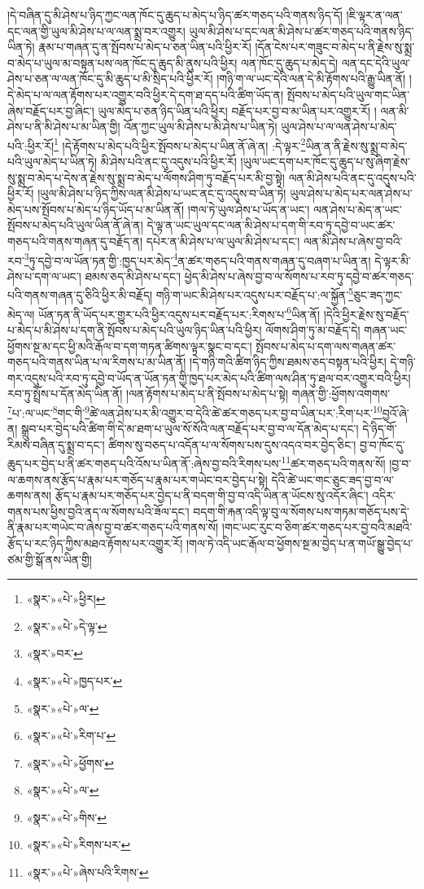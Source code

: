 །དེ་བཞིན་དུ་མི་ཤེས་པ་ཉིད་ཀྱང་ལན་ཁོང་དུ་ཆུད་པ་མེད་པ་ཉིད་ཚར་གཅད་པའི་གནས་ཉིད་དོ། །ཇི་ལྟར་ན་ལན་དང་ལན་གྱི་ཡུལ་མི་ཤེས་པ་ལ་ལན་སྨྲ་བར་འགྱུར། ཡུལ་མི་ཤེས་པ་དང་ལན་མི་ཤེས་པ་ཚར་གཅད་པའི་གནས་ཉིད་ཡིན་ཏེ། རྣམ་པ་གཞན་དུ་ན་སྤོབས་པ་མེད་པ་ཅན་ཡིན་པའི་ཕྱིར་རོ། །དོན་ངེས་པར་གཟུང་བ་མེད་པ་ནི་རྗེས་སུ་སྨྲ་བ་མེད་པ་ཡུལ་མ་བསྟན་པས་ལན་ཁོང་དུ་ཆུད་མི་ནུས་པའི་ཕྱིར། ལན་ཁོང་དུ་ཆུད་པ་མེད་དེ། ལན་དང་དེའི་ཡུལ་ཤེས་པ་ཅན་ལ་ལན་ཁོང་དུ་མི་ཆུད་པ་མི་སྲིད་པའི་ཕྱིར་རོ། །གཉི་ག་ལ་ཡང་དེའི་ལན་དེ་མི་རྟོགས་པའི་རྒྱུ་ཡིན་ནོ། །དེ་མེད་པ་ལ་ལན་རྟོགས་པར་འགྱུར་བའི་ཕྱིར་དེ་དག་ཐ་དད་པའི་ཚིག་ཡོད་ན། སྤོབས་པ་མེད་པའི་ཡུལ་གང་ཡིན་ཞེས་བརྗོད་པར་བྱ་ཞིང་། ཡུལ་མེད་པ་ཅན་ཉིད་ཡིན་པའི་ཕྱིར། བརྗོད་པར་བྱ་བ་མ་ཡིན་པར་འགྱུར་རོ། །
ལན་མི་ཤེས་པ་ནི་མི་ཤེས་པ་མ་ཡིན་གྱི། འོན་ཀྱང་ཡུལ་མི་ཤེས་པ་མི་ཤེས་པ་ཡིན་ཏེ། ཡུལ་ཤེས་པ་ལ་ལན་ཤེས་པ་མེད་པའི་:ཕྱིར་རོ།\footnote{«སྣར་»«པེ་»ཕྱིར།} །དེ་རྟོགས་པ་མེད་པའི་ཕྱིར་སྤོབས་པ་མེད་པ་ཡིན་ནོ་ཞེ་ན། :དེ་ལྟར་\footnote{«སྣར་»«པེ་»དེ་ལྟ་}ཡིན་ན་ནི་རྗེས་སུ་སྨྲ་བ་མེད་པའི་ཡུལ་མེད་པ་ཡིན་ཏེ། མི་ཤེས་པའི་ནང་དུ་འདུས་པའི་ཕྱིར་རོ། །ཡུལ་ཡང་དག་པར་ཁོང་དུ་ཆུད་པ་སུ་ཞིག་རྗེས་སུ་སྨྲ་བ་མེད་པ་དེས་ན་རྗེས་སུ་སྨྲ་བ་མེད་པ་ལོགས་ཤིག་ཏུ་བརྗོད་པར་མི་བྱ་སྟེ། ལན་མི་ཤེས་པའི་ནང་དུ་འདུས་པའི་ཕྱིར་རོ། །ཡུལ་མི་ཤེས་པ་ཉིད་ཀྱིས་ལན་མི་ཤེས་པ་ཡང་ནང་དུ་འདུས་བ་ཡིན་ཏེ། ཡུལ་ཤེས་པ་མེད་པར་ལན་ཤེས་པ་མེད་པས་སྤོབས་པ་མེད་པ་ཉིད་ཡོད་པ་མ་ཡིན་ནོ། །གལ་ཏེ་ཡུལ་ཤེས་པ་ཡོད་ན་ཡང་། ལན་ཤེས་པ་མེད་ན་ཡང་སྤོབས་པ་མེད་པའི་ཡུལ་ཡིན་ནོ་ཞེ་ན། དེ་ལྟ་ན་ཡང་ཡུལ་དང་ལན་མི་ཤེས་པ་དག་གི་རབ་ཏུ་དབྱེ་བ་ཡང་ཚར་གཅད་པའི་གནས་གཞན་དུ་བརྗོད་ན། དཔེར་ན་མི་ཤེས་པ་ལ་ཡུལ་མི་ཤེས་པ་དང་། ལན་མི་ཤེས་པ་ཞེས་བྱ་བའི་རབ་\footnote{«སྣར་»བར་}ཏུ་དབྱེ་བ་ལ་ཡོན་ཏན་གྱི་:ཁྱད་པར་མེད་\footnote{«སྣར་»«པེ་»ཁྱད་པར་}ན་ཚར་གཅད་པའི་གནས་གཞན་དུ་བཞག་པ་ཡིན་ན། དེ་ལྟར་མི་ཤེས་པ་དག་ལ་ཡང་། ཐམས་ཅད་མི་ཤེས་པ་དང་། ཕྱེད་མི་ཤེས་པ་ཞེས་བྱ་བ་ལ་སོགས་པ་རབ་ཏུ་དབྱེ་བ་ཚར་གཅད་པའི་གནས་གཞན་དུ་ཅིའི་ཕྱིར་མི་བརྗོད། གཉི་ག་ཡང་མི་ཤེས་པར་འདུས་པར་བརྗོད་པ་:ལ་སྐྱོན་\footnote{«སྣར་»«པེ་»ལ་}ཅུང་ཟད་ཀྱང་མེད་ལ། ཡོན་ཏན་ནི་ཡོད་པར་གྱུར་པའི་ཕྱིར་འདུས་པར་བརྗོད་པར་:རིགས་པ་\footnote{«སྣར་»«པེ་»རིག་པ་}ཡིན་ནོ། །དེའི་ཕྱིར་རྗེས་སུ་བརྗོད་པ་མེད་པ་མི་ཤེས་པ་དག་ནི་སྤོབས་པ་མེད་པའི་ཡུལ་ཉིད་ཡིན་པའི་ཕྱིར། ལོགས་ཤིག་ཏུ་མ་བརྗོད་དེ། གཞན་ཡང་ཕྱོགས་སྔ་མ་དང་ཕྱི་མའི་རྒོལ་བ་དག་གཏན་ཚིགས་ལྟར་སྣང་བ་དང་། སྤོབས་པ་མེད་པ་དག་ལས་གཞན་ཚར་གཅད་པའི་གནས་ཡིན་པ་ལ་རིགས་པ་མ་ཡིན་ནོ། །དེ་གཉི་གའི་ཚིག་ཉིད་ཀྱིས་ཐམས་ཅད་བསྟན་པའི་ཕྱིར། དེ་གཉི་གར་འདུས་པའི་རབ་ཏུ་དབྱེ་བ་ཡོད་ན་ཡོན་ཏན་གྱི་ཁྱད་པར་མེད་པའི་ཚིག་ལས་ཤིན་ཏུ་ཐལ་བར་འགྱུར་བའི་ཕྱིར། རབ་ཏུ་སྤྲོས་པ་དོན་མེད་ཡིན་ནོ། །ལན་རྟོགས་པ་མེད་པ་ནི་སྤོབས་པ་མེད་པ་སྟེ། གཞན་གྱི་:ཕྱོགས་འགགས་\footnote{«སྣར་»«པེ་»ཕྱོགས་}པ་:ལ་ཡང་\footnote{«སྣར་»«པེ་»ལ་}གང་གི་\footnote{«སྣར་»«པེ་»གིས་}ཚེ་ལན་ཤེས་པར་མི་འགྱུར་བ་དེའི་ཚེ་ཚར་གཅད་པར་བྱ་བ་ཡིན་པར་:རིག་པར་\footnote{«སྣར་»«པེ་»རིགས་པར་}བྱའོ་ཞེ་ན། སྒྲུབ་པར་བྱེད་པའི་ཚིག་གི་དེ་མ་ཐག་པ་ཡུལ་སོ་སོའི་ལན་བརྗོད་པར་བྱ་བ་ལ་དོན་མེད་པ་དང་། དེ་ཉིད་གོ་རིམས་བཞིན་དུ་སྨྲ་བ་དང་། ཚིགས་སུ་བཅད་པ་འདོན་པ་ལ་སོགས་པས་དུས་འདའ་བར་བྱེད་ཅིང་། བྱ་བ་ཁོང་དུ་ཆུད་པར་བྱེད་པ་ནི་ཚར་གཅད་པའི་འོས་པ་ཡིན་ནོ་:ཞེས་བྱ་བའི་རིགས་པས་\footnote{«སྣར་»«པེ་»ཞེས་པའི་རིགས་}ཚར་གཅད་པའི་གནས་སོ། །བྱ་བ་ལ་ཆགས་ནས་རྩོད་པ་རྣམ་པར་གཅོད་པ་རྣམ་པར་གཡེང་བར་བྱེད་པ་སྟེ། དེའི་ཚེ་ཡང་གང་ཅུང་ཟད་བྱ་བ་ལ་ཆགས་ནས། རྩོད་པ་རྣམ་པར་གཅོད་པར་བྱེད་པ་ནི་བདག་གི་བྱ་བ་འདི་ཡིན་ན་ཡོངས་སུ་འདོར་ཞིང་། འདིར་གནས་པས་ཕྱིས་བྱའི་ནད་ལ་སོགས་པའི་ཟོལ་དང་། བདག་གི་རྐན་འདི་ལྟ་བུ་ལ་སོགས་པས་གཏམ་གཅོད་པས་དེ་ནི་རྣམ་པར་གཡེང་བ་ཞེས་བྱ་བ་ཚར་གཅད་པའི་གནས་སོ། །གང་ཡང་རུང་བ་ཅིག་ཚར་གཅད་པར་བྱ་བའི་མཐའི་རྩོད་པ་རང་ཉིད་ཀྱིས་མཐའ་རྟོགས་པར་འགྱུར་རོ། །གལ་ཏེ་འདི་ཡང་རྒོལ་བ་ཕྱོགས་སྔ་མ་བྱེད་པ་ན་གཡོ་སྒྱུ་བྱེད་པ་ཙམ་གྱི་སྒོ་ནས་ཡིན་གྱི། 